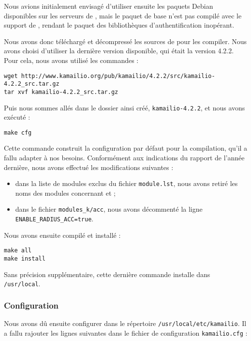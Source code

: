 Nous avions initialement envisagé d’utiliser ensuite les paquets Debian disponibles sur les serveurs de {\kam}, mais le paquet de base n’est pas compilé avec le support de {\rad}, rendant le paquet des bibliothèques d’authentification {\rad} inopérant.

Nous avons donc téléchargé et décompressé les sources de {\kam} pour les compiler. Nous avons choisi d’utiliser la dernière version disponible, qui était la version 4.2.2. Pour cela, nous avons utilisé les commandes :

\begin{verbatim}
wget http://www.kamailio.org/pub/kamailio/4.2.2/src/kamailio-4.2.2_src.tar.gz
tar xvf kamailio-4.2.2_src.tar.gz
\end{verbatim}

Puis nous sommes allés dans le dossier ainsi créé, \texttt{kamailio-4.2.2}, et nous avons exécuté :

\begin{verbatim}
make cfg
\end{verbatim}

Cette commande construit la configuration par défaut pour la compilation, qu’il a fallu adapter à nos besoins. Conformément aux indications du rapport de l’année dernière, nous avons effectué les modifications suivantes :

\begin{itemize}
	\item{dans la liste de modules exclus du fichier \texttt{module.lst}, nous avons retiré les noms des modules concernant {\my} et {\rad}} ;
	\item{dans le fichier \texttt{modules\_k/acc}, nous avons décommenté la ligne \texttt{ENABLE\_RADIUS\_ACC=true}}.
\end{itemize}

Nous avons ensuite compilé et installé {\kam} :

\begin{verbatim}
make all
make install
\end{verbatim}

Sans précision supplémentaire, cette dernière commande installe {\kam} dans \texttt{/usr/local}.

\subsubsection{Configuration}

Nous avons dû ensuite configurer {\kam} dans le répertoire \texttt{/usr/local/etc/kamailio}. Il a fallu rajouter les lignes suivantes dans le fichier de configuration \texttt{kamailio.cfg} :

